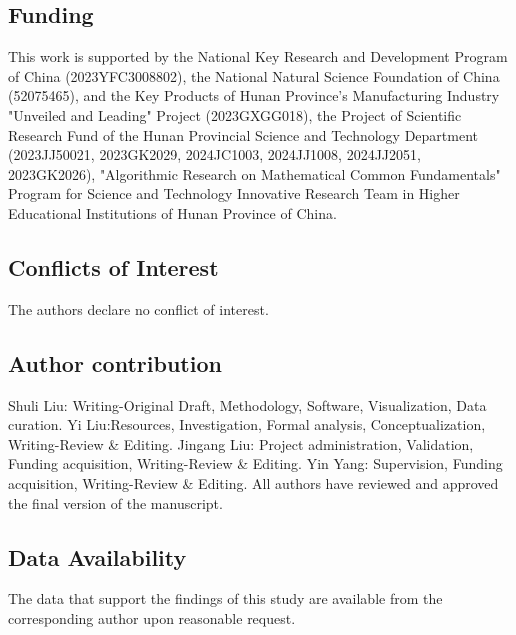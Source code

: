 \documentclass[pdflatex,sn-mathphys-num]{sn-jnl}%
\theoremstyle{thmstyleone}%
\theoremstyle{thmstyletwo}%
\theoremstyle{thmstylethree}%
\begin{document}
\subsection*{Funding}

This work is supported by the National Key Research and Development Program of China (2023YFC3008802), the National Natural Science Foundation of China (52075465), and the Key Products of Hunan Province's Manufacturing Industry "Unveiled and Leading" Project (2023GXGG018), the Project of Scientific Research Fund of the Hunan Provincial Science and Technology Department (2023JJ50021, 2023GK2029, 2024JC1003, 2024JJ1008, 2024JJ2051, 2023GK2026), "Algorithmic Research on Mathematical Common Fundamentals" Program for Science and Technology Innovative Research Team in Higher Educational Institutions of Hunan Province of China.

\subsection*{Conflicts of Interest}
The authors declare no conflict of interest.

\subsection*{Author contribution}
Shuli Liu: Writing-Original Draft, Methodology, Software, Visualization, Data curation. Yi Liu:Resources, Investigation, Formal analysis, Conceptualization, Writing-Review \& Editing. 
Jingang Liu: Project administration, Validation, Funding acquisition, Writing-Review \& Editing. 
Yin Yang: Supervision, Funding acquisition, Writing-Review \& Editing. 
All authors have reviewed and approved the final version of the manuscript.
\subsection*{Data Availability}
The data that support the findings of this study are available from the corresponding author upon reasonable request.
\end{document}
